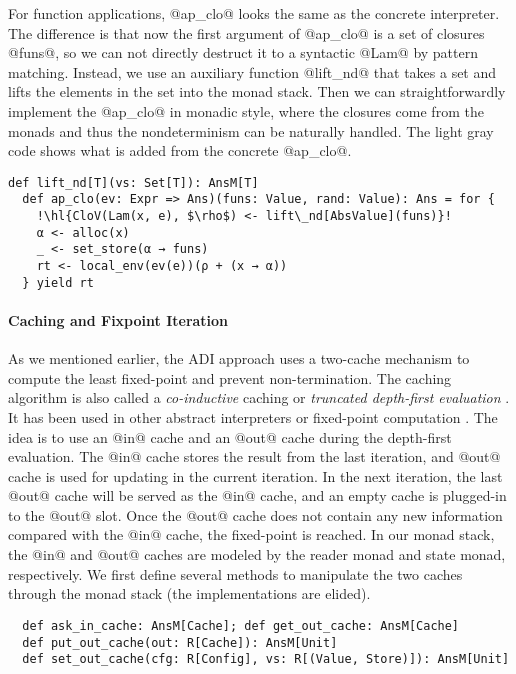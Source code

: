 For function applications, @ap_clo@ looks the same as the concrete interpreter.
The difference is that now the first argument of @ap_clo@ is a set of closures
@funs@, so we can not directly destruct it to a syntactic @Lam@ by pattern
matching. Instead, we use an auxiliary function @lift_nd@ that takes a set and
lifts the elements in the set into the monad stack. Then we can
straightforwardly implement the @ap_clo@ in monadic style, where the closures
come from the monads and thus the nondeterminism can be naturally handled. The
light gray code shows what is added from the concrete @ap_clo@.
\begin{lstlisting}[escapechar=!]
  def lift_nd[T](vs: Set[T]): AnsM[T]
  def ap_clo(ev: Expr => Ans)(funs: Value, rand: Value): Ans = for {
    !\hl{CloV(Lam(x, e), $\rho$) <- lift\_nd[AbsValue](funs)}!
    α <- alloc(x)
    _ <- set_store(α → funs)
    rt <- local_env(ev(e))(ρ + (x → α))
  } yield rt
\end{lstlisting}

\paragraph{Caching and Fixpoint Iteration}
As we mentioned earlier, the ADI approach uses a two-cache mechanism to
compute the least fixed-point and prevent non-termination.
The caching algorithm is also called a \textit{co-inductive} caching or
\textit{truncated depth-first evaluation} \cite{Rosendahl:AbsIntPL}. It has
been used in other abstract interpreters or fixed-point computation
\cite{DBLP:journals/pacmpl/DaraisLNH17, Wei:2018:RAA:3243631.3236800,
  Rosendahl:AbsIntPL}. The idea is to use an @in@ cache and an @out@ cache during
the depth-first evaluation. The @in@ cache stores the result from the last
iteration, and @out@ cache is used for updating in the current iteration. In
the next iteration, the last @out@ cache will be served as the @in@ cache, and
an empty cache is plugged-in to the @out@ slot. Once the @out@ cache does not
contain any new information compared with the @in@ cache, the fixed-point is
reached.
In our monad stack, the @in@ and @out@ caches are modeled by the reader monad and
state monad, respectively. We first define several methods to manipulate
the two caches through the monad stack (the implementations are elided).
\begin{lstlisting}
  def ask_in_cache: AnsM[Cache]; def get_out_cache: AnsM[Cache]
  def put_out_cache(out: R[Cache]): AnsM[Unit]
  def set_out_cache(cfg: R[Config], vs: R[(Value, Store)]): AnsM[Unit]
\end{lstlisting}

